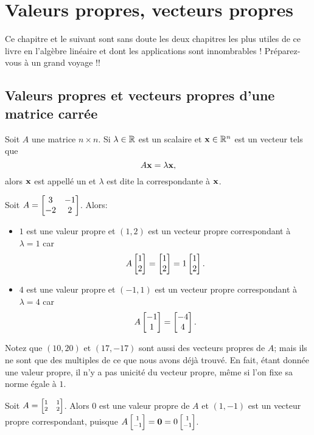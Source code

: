 \chapter{Valeurs propres, vecteurs propres}
\label{chapter:Fr_26-Eigen}
Ce chapitre et le suivant sont sans doute les deux chapitres les plus utiles de ce livre en l'algèbre linéaire et dont les applications sont innombrables ! Préparez-vous à un grand voyage !\!!

\section[Valeurs et vecteurs propres]{Valeurs propres et vecteurs propres d'une matrice carr\'ee}
\begin{definition}\label{section:eigen}
Soit $A$ une matrice $n\times n$.  
Si $\lambda\in \mathbb{R}$ est un scalaire et $\mathbf{x} \in \mathbb{R}^n$ est un vecteur  tels que
$$
A \mathbf{x} = \lambda \mathbf{x},
$$
alors $\mathbf{x}$ est appell\'e un  et $\lambda$ est dite la  correspondante à $\mathbf{x}$.
\end{definition}

\begin{myexample}
Soit $A = \left[ \begin{matrix} 3 & -1 \\ -2 & 2 \end{matrix} \right]$.  Alors:
\begin{itemize}
\item $1$ est une valeur propre et $(1,2)$ est un vecteur propre correspondant à $\lambda = 1$ car $$A\left[ \begin{matrix} 1\\2 \end{matrix} \right] = \left[ \begin{matrix} 1\\2 \end{matrix} \right]=1\left[ \begin{matrix} 1\\2 \end{matrix} \right].$$
\item $4$ est une valeur propre et $(-1,1)$ est un vecteur propre correspondant à $\lambda = 4$ car $$A\left[ \begin{matrix} -1\\1 \end{matrix} \right] = \left[ \begin{matrix} -4\\4 \end{matrix} \right].$$
\end{itemize}
Notez que $(10,20)$ et $(17,-17)$ sont aussi des vecteurs propres de $A$; 
mais ils ne sont que des multiples de ce que nous avons déjà trouvé. En fait, étant donnée une valeur propre, il n'y a pas unicité du vecteur propre, même si l'on fixe sa norme égale à $1$.
\end{myexample}

\begin{myexample}
Soit $A = \scriptsize\left[ \begin{matrix} 1 & 1\\ 2 & 2 \end{matrix} \right]$.  Alors 
$0$ est une valeur propre de $A$ et $(1,-1)$ est un vecteur propre correspondant,
puisque $A\scriptsize\left[ \begin{matrix} 1\\-1 \end{matrix} \right] = \mathbf{0} = 0\left[ \begin{matrix} 1\\-1 \end{matrix} \right]$.
\end{myexample}

